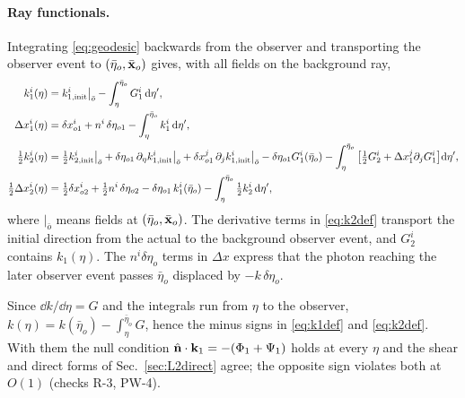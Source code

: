 \paragraph{Ray functionals.}  Integrating \eqref{eq:geodesic} backwards from the observer and transporting the observer
event to $(\bar\eta_o,\bar{\mathbf x}_o)$ gives, with all fields on the background ray,
\begin{align}
k_1^i(\eta)&=k^i_{1,\rm init}\big|_{\bar o}-\int_\eta^{\bar\eta_o}G_1^i\,\mathrm d\eta',\label{eq:k1def}\\
\Delta x_1^i(\eta)&=\delta x^i_{o1}+n^i\,\delta\eta_{o1}-\int_\eta^{\bar\eta_o}k_1^i\,\mathrm d\eta',\label{eq:Dx1def}\\
\tfrac12k_2^i(\eta)&=\tfrac12k^i_{2,\rm init}\big|_{\bar o}+\delta\eta_{o1}\,\partial_\eta k^i_{1,\rm init}\big|_{\bar o}
+\delta x^j_{o1}\,\partial_jk^i_{1,\rm init}\big|_{\bar o}-\delta\eta_{o1}G_1^i(\bar\eta_o)
-\int_\eta^{\bar\eta_o}\big[\tfrac12G_2^i+\Delta x_1^j\partial_jG_1^i\big]\mathrm d\eta',\label{eq:k2def}\\
\tfrac12\Delta x_2^i(\eta)&=\tfrac12\delta x^i_{o2}+\tfrac12n^i\,\delta\eta_{o2}-\delta\eta_{o1}\,k_1^i(\bar\eta_o)-\int_\eta^{\bar\eta_o}\tfrac12k_2^i\,\mathrm d\eta',\label{eq:Dx2def}
\end{align}
where $|_{\bar o}$ means fields at $(\bar\eta_o,\bar{\mathbf x}_o)$.  The derivative terms in \eqref{eq:k2def} transport the initial
direction from the actual to the background observer event, and $G_2^i$ contains $k_1(\eta)$.  The $n^i\delta\eta_o$ terms
in $\Delta x$ express that the photon reaching the later observer event passes $\bar\eta_o$ displaced by $-k\,\delta\eta_o$.
\begin{remark}\label{rem:signslip}
Since $\dd k/\dd\eta=G$ and the integrals run from $\eta$ to the observer, $k(\eta)=k(\bar\eta_o)-\int_\eta^{\bar\eta_o}G$, hence the minus signs in
\eqref{eq:k1def} and \eqref{eq:k2def}.  With them the null condition $\hat{\mathbf n}\cdot\mathbf k_1=-(\Phi_1+\Psi_1)$ holds at every $\eta$ and the shear and direct
forms of Sec.~\ref{sec:L2direct} agree; the opposite sign violates both at $O(1)$ (checks R-3, PW-4).
\end{remark}

